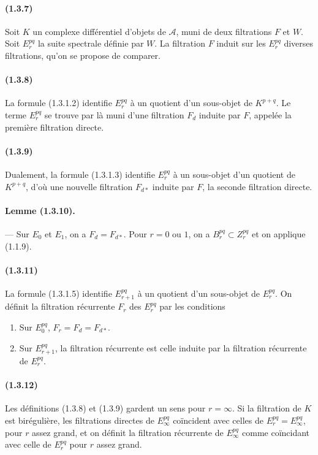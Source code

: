 \documentclass[10pt]{article}
\newcommand{\calA}{\mathcal A}
\begin{document}
\paragraph{(1.3.7)} Soit $K$ un complexe différentiel d'objets de $\calA$, muni de deux filtrations $F$ et $W$. Soit $E_r^{pq}$ la suite spectrale définie par $W$. La filtration $F$ induit sur les $E_r^{pq}$ diverses filtrations, qu'on se propose de comparer.

\paragraph{(1.3.8)} La formule (1.3.1.2) identifie $E_r^{pq}$ à un quotient d'un sous-objet de $K^{p+q}$. Le terme $E_r^{pq}$ se trouve par là muni d'une filtration $F_d$ induite par $F$, appelée la première filtration directe.

\paragraph{(1.3.9)} Dualement, la formule (1.3.1.3) identifie $E_r^{pq}$ à un sous-objet d'un quotient de $K^{p+q}$, d'où une nouvelle filtration $F_{d*}$ induite par $F$, la seconde filtration directe.

\paragraph{Lemme (1.3.10).} --- Sur $E_0$ et $E_1$, on a $F_d=F_{d*}$. Pour $r=0$ ou $1$, on a $B_r^{pq}\subset Z_r^{pq}$ et on applique (1.1.9).

\paragraph{(1.3.11)} La formule (1.3.1.5) identifie $E_{r+1}^{pq}$ à un quotient d'un sous-objet de $E_r^{pq}$. On définit la filtration récurrente $F_r$ des $E_r^{pq}$ par les conditions
\begin{enumerate}[label=(\roman*)]
\item Sur $E_0^{pq}$, $F_r=F_d=F_{d*}$.
\item Sur $E_{r+1}^{pq}$, la filtration récurrente est celle induite par la filtration récurrente de $E_r^{pq}$.
\end{enumerate}

\paragraph{(1.3.12)} Les définitions (1.3.8) et (1.3.9) gardent un sens pour $r=\infty$. Si la filtration de $K$ est birégulière, les filtrations directes de $E_\infty^{pq}$ coïncident avec celles de $E_r^{pq}=E_\infty^{pq}$, pour $r$ assez grand, et on définit la filtration récurrente de $E_\infty^{pq}$ comme coïncidant avec celle de $E_r^{pq}$ pour $r$ assez grand.
\end{document}

